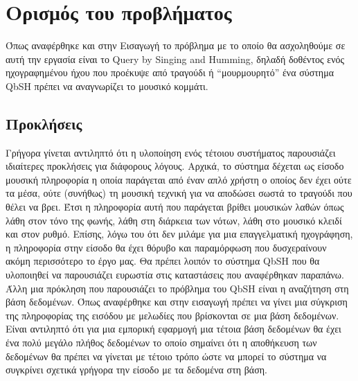 \section{Ορισμός του προβλήματος}
Όπως αναφέρθηκε και στην Εισαγωγή το πρόβλημα με το οποίο θα ασχοληθούμε σε
αυτή την εργασία είναι το Query by Singing and Humming, δηλαδή δοθέντος ενός
ηχογραφημένου ήχου που προέκυψε από τραγούδι ή “μουρμουρητό” ένα σύστημα QbSH
πρέπει να αναγνωρίζει το μουσικό κομμάτι.

\subsection{Προκλήσεις}
Γρήγορα γίνεται αντιληπτό ότι η υλοποίηση ενός τέτοιου συστήματος παρουσιάζει
ιδιαίτερες προκλήσεις για διάφορους λόγους. Αρχικά, το σύστημα δέχεται ως
είσοδο μουσική πληροφορία η οποία παράγεται από έναν απλό χρήστη ο οποίος δεν
έχει ούτε τα μέσα, ούτε (συνήθως) τη μουσική τεχνική για να αποδώσει σωστά το
τραγούδι που θέλει να βρει. Έτσι η πληροφορία αυτή που παράγεται βρίθει
μουσικών λαθών όπως λάθη στον τόνο της φωνής, λάθη στη διάρκεια των νότων,
λάθη στο μουσικό κλειδί και στον ρυθμό. Επίσης, λόγω του ότι δεν μιλάμε για
μια επαγγελματική ηχογράφηση, η πληροφορία στην είσοδο θα έχει θόρυβο και
παραμόρφωση που δυσχεραίνουν ακόμη περισσότερο το έργο μας. Θα πρέπει λοιπόν
το σύστημα QbSH που θα υλοποιηθεί να παρουσιάζει ευρωστία στις καταστάσεις που
αναφέρθηκαν παραπάνω.
\newline
Άλλη μια πρόκληση που παρουσιάζει το πρόβλημα του QbSH είναι η αναζήτηση στη
βάση δεδομένων. Όπως αναφέρθηκε και στην εισαγωγή πρέπει να γίνει μια σύγκριση
της πληροφορίας της εισόδου με μελωδίες που βρίσκονται σε μια βάση δεδομένων.
Είναι αντιληπτό ότι για μια εμπορική εφαρμογή μια τέτοια βάση δεδομένων θα
έχει ένα πολύ μεγάλο πλήθος δεδομένων το οποίο σημαίνει ότι η αποθήκευση των
δεδομένων θα πρέπει να γίνεται με τέτοιο τρόπο ώστε να μπορεί το σύστημα
να συγκρίνει σχετικά γρήγορα την είσοδο με τα δεδομένα στη βάση.

